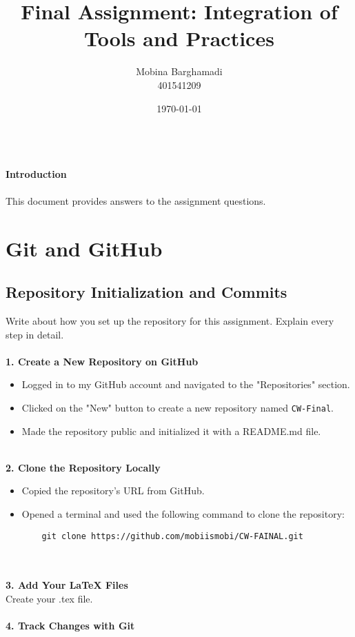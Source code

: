 \documentclass[a4paper,12pt]{article}
\title{\textbf{Final Assignment: Integration of Tools and Practices}}
\author{Mobina Barghamadi\\401541209}
\date{\today}
\begin{document}
\maketitle


\\\textbf{Introduction}
\\
\\This document provides answers to the assignment questions.

\clearpage


\section{Git and GitHub}

\subsection{Repository Initialization and Commits}
Write about how you set up the repository for this assignment. Explain every step in detail.
\\
\\\textbf{1. Create a New Repository on GitHub}
\begin{itemize}
    \item Logged in to my GitHub account and navigated to the "Repositories" section.
    \item Clicked on the "New" button to create a new repository named \texttt{CW-Final}.
    \item Made the repository public and initialized it with a README.md file.
\end{itemize}
\\
\textbf{2. Clone the Repository Locally}
\begin{itemize}
    \item Copied the repository’s URL from GitHub.
    \item Opened a terminal and used the following command to clone the repository:
    \begin{verbatim}
    git clone https://github.com/mobiismobi/CW-FAINAL.git
    \end{verbatim}
\end{itemize}
\\
\\\textbf{3. Add Your LaTeX Files}
\\Create your .tex file.
\\
\\\textbf{4. Track Changes with Git}
\end{document}

